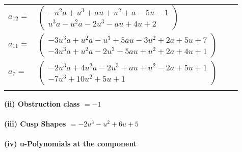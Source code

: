 \documentclass[1p]{elsarticle_modified}
\theoremstyle{definition}
\begin{document}
\begin{tabular}{m{7pt} m{180pt} m{7pt} m{180pt} }
\flushright $a_{12}=$&$\begin{pmatrix}- u^2 a+u^3+a u+u^2+a-5 u-1\\u^3 a- u^2 a-2 u^3- a u+4 u+2\end{pmatrix}$ \\
\flushright $a_{11}=$&$\begin{pmatrix}-3 u^3 a+u^2 a- u^3+5 a u-3 u^2+2 a+5 u+7\\-3 u^3 a+u^2 a-2 u^3+5 a u+u^2+2 a+4 u+1\end{pmatrix}$ \\
\flushright $a_{7}=$&$\begin{pmatrix}-2 u^3 a+4 u^2 a-2 u^3+a u+u^2-2 a+5 u+1\\-7 u^3+10 u^2+5 u+1\end{pmatrix}$\\&\end{tabular}
\flushleft \textbf{(ii) Obstruction class $= -1$}\\~\\
\flushleft \textbf{(iii) Cusp Shapes $= -2 u^3- u^2+6 u+5$}\\~\\
\newpage\renewcommand{\arraystretch}{1}
\flushleft \textbf{(iv) u-Polynomials at the component}\newline \\
\end{document}
